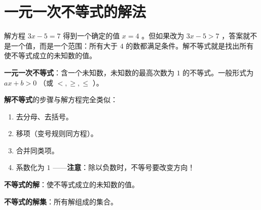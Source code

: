 \section*{一元一次不等式的解法}


\begin{explore}


解方程 $3x - 5 = 7$ 得到一个确定的值 $x = 4$ 。但如果改为 $3x - 5 > 7$ ，答案就不是一个值，而是一个范围：所有大于 $4$ 的数都满足条件。解不等式就是找出所有使不等式成立的未知数的值。

\end{explore}

\begin{understand}


\textbf{一元一次不等式}：含一个未知数，未知数的最高次数为 $1$ 的不等式。一般形式为 $ax + b > 0$ （或 $<, \geq, \leq$ ）。

\textbf{解不等式}的步骤与解方程完全类似：

\begin{enumerate}
  \item 去分母、去括号。
  \item 移项（变号规则同方程）。
  \item 合并同类项。
  \item 系数化为 $1$ ——\textbf{注意}：除以负数时，不等号要改变方向！
\end{enumerate}


\textbf{不等式的解}：使不等式成立的未知数的值。

\textbf{不等式的解集}：所有解组成的集合。

\end{understand}

